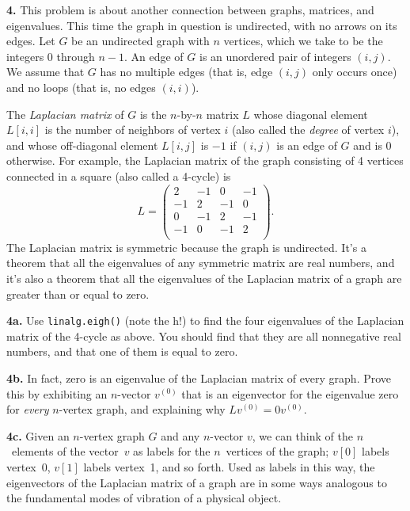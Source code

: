 \documentclass[11pt]{article}
\begin{document}
\par\bigskip
{\bf 4.}
This problem is about another connection between graphs, matrices,
and eigenvalues.
This time the graph in question is undirected, with no arrows on its edges.
Let $G$ be an undirected graph with $n$ vertices, 
which we take to be the integers 0 through $n-1$.
An edge of $G$ is an unordered pair of integers $(i,j)$.
We assume that $G$ has no multiple edges 
(that is, edge $(i,j)$ only occurs once)
and no loops (that is, no edges $(i,i)$).

The {\em Laplacian matrix} of $G$ is the $n$-by-$n$ matrix $L$ 
whose diagonal element $L[i, i]$ is the number of neighbors of vertex $i$
(also called the {\em degree} of vertex $i$),
and whose off-diagonal element $L[i, j]$ 
is $-1$ if $(i,j)$ is an edge of $G$ and is $0$ otherwise.
For example, the Laplacian matrix of the graph consisting of 4 vertices
connected in a square (also called a 4-cycle) is
$$ 
L = \left(
\begin{array}{cccc}
 2 & -1 &  0 & -1 \\    
-1 &  2 & -1 &  0 \\    
 0 & -1 &  2 & -1 \\    
-1 &  0 & -1 &  2 \\    
\end{array} 
\right).
$$
The Laplacian matrix is symmetric because the graph is undirected.
It's a theorem that all the eigenvalues of any symmetric matrix are real numbers,
and it's also a theorem that all the eigenvalues of the Laplacian matrix
of a graph are greater than or equal to zero.

\par\medskip
{\bf 4a.}
Use {\tt linalg.eigh()} (note the h!) to find the four eigenvalues of the 
Laplacian matrix of the 4-cycle as above.
You should find that they are all nonnegative real numbers,
and that one of them is equal to zero.

\par\medskip
{\bf 4b.}
In fact, zero is an eigenvalue of the Laplacian matrix of every graph.
Prove this by exhibiting an $n$-vector $v^{(0)}$ that is an eigenvector 
for the eigenvalue zero for {\em every} $n$-vertex graph, 
and explaining why $Lv^{(0)} = 0v^{(0)}$.

\par\medskip
{\bf 4c.} 
Given an $n$-vertex graph $G$ and any $n$-vector $v$, 
we can think of the $n$~elements of the vector~$v$ as labels for the 
$n$~vertices of the graph; 
$v[0]$ labels vertex~0, $v[1]$ labels vertex~1, and so forth.
Used as labels in this way,
the eigenvectors of the Laplacian matrix of a graph are in some ways
analogous to the fundamental modes of vibration of a physical object.
\end{document}
